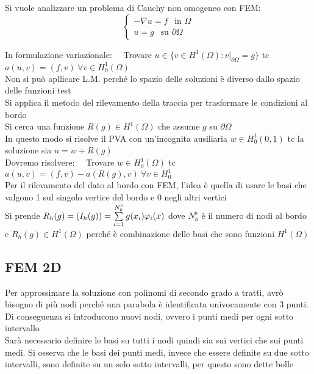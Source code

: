 \documentclass{article}
\newcommand{\om}{\Omega}
\begin{document}
Si vuole analizzare un problema di Cauchy non omogeneo con FEM:
\[
\begin{cases}
    -\nabla u = f \ \ \text{ in } \om\\
    u=g \ \ \text{ su } \partial \om
\end{cases}
\]

In formulazione variazionale: \ \ Trovare $u\in \{v\in H^1(\om) : v|_{\partial\om} = g\}$ tc $a(u,v)=(f,v) \ \forall v\in H^1_0(\om)$\\
Non si può apllicare L.M. perché lo spazio delle soluzioni è diverso dallo spazio delle funzioni test\\

Si applica il metodo del rilevamento della traccia per trasformare le condizioni al bordo\\
Si cerca una funzione $R(g)\in H^1(\om)$ che assume $g$ su $\partial\om$\\
In questo modo si risolve il PVA con un'incognita ausiliaria $w\in H_0^1(0,1)$ tc la soluzione sia $u=w+R(g)$\\
Dovremo risolvere: \ \ Trovare $w\in H_0^1(\om)$ tc $a(u,v)=(f,v)-a(R(g),v) \ \forall v\in H_0^1$\\

Per il rilevamento del dato al bordo con FEM, l'idea è quella di usare le basi che valgono 1 sul singolo vertice del bordo e 0 negli altri vertici\\
Si prende $R_h(g)=(I_h(g))=\sum\limits_{i=1}^{N_h^b} g(x_i)\varphi_i(x)$ dove $N_h^b$ è il numero di nodi al bordo e $R_h(g)\in H^1(\om)$ perché è combinazione delle basi che sono funzioni $H^1(\om)$\\

\subsection{FEM 2D}

Per approssimare la soluzione con polinomi di secondo grado a tratti, avrò bisogno di più nodi perché una parabola è identificata univocamente con 3 punti. Di conseguenza si introducono nuovi nodi, ovvero i punti medi per ogni sotto intervallo\\
Sarà necessario definire le basi su tutti i nodi quindi sia sui vertici che sui punti medi. Si osserva che le basi dei punti medi, invece che essere definite su due sotto intervalli, sono definite su un solo sotto intervalli, per questo sono dette bolle

\end{document}

